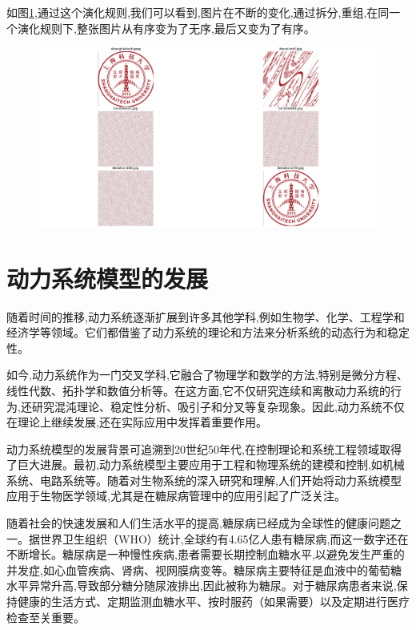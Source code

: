 如图\ref{fig:arnold_cat_map},通过这个演化规则,我们可以看到,图片在不断的变化,通过拆分,重组,在同一个演化规则下,整张图片从有序变为了无序,最后又变为了有序。

\begin{figure}[H]
    \centering
    \includegraphics[width=\textwidth]{Img/arnold.png}
    \label{fig:arnold_cat_map}
\end{figure}

\section{动力系统模型的发展}
随着时间的推移,动力系统逐渐扩展到许多其他学科,例如生物学、化学、工程学和经济学等领域。它们都借鉴了动力系统的理论和方法来分析系统的动态行为和稳定性。

如今,动力系统作为一门交叉学科,它融合了物理学和数学的方法,特别是微分方程、线性代数、拓扑学和数值分析等。在这方面,它不仅研究连续和离散动力系统的行为,还研究混沌理论、稳定性分析、吸引子和分叉等复杂现象。因此,动力系统不仅在理论上继续发展,还在实际应用中发挥着重要作用。

动力系统模型的发展背景可追溯到20世纪50年代,在控制理论和系统工程领域取得了巨大进展。最初,动力系统模型主要应用于工程和物理系统的建模和控制,如机械系统、电路系统等\cite{hargrove1998dynamic}。随着对生物系统的深入研究和理解,人们开始将动力系统模型应用于生物医学领域,尤其是在糖尿病管理中的应用引起了广泛关注\cite{ellner2006dynamic}。

随着社会的快速发展和人们生活水平的提高,糖尿病已经成为全球性的健康问题之一。据世界卫生组织（WHO）统计,全球约有4.65亿人患有糖尿病,而这一数字还在不断增长\cite{zimmet2016diabetes}。糖尿病是一种慢性疾病,患者需要长期控制血糖水平,以避免发生严重的并发症,如心血管疾病、肾病、视网膜病变等\cite{zheng2018global}。糖尿病主要特征是血液中的葡萄糖水平异常升高,导致部分糖分随尿液排出,因此被称为糖尿。对于糖尿病患者来说,保持健康的生活方式、定期监测血糖水平、按时服药（如果需要）以及定期进行医疗检查至关重要。

